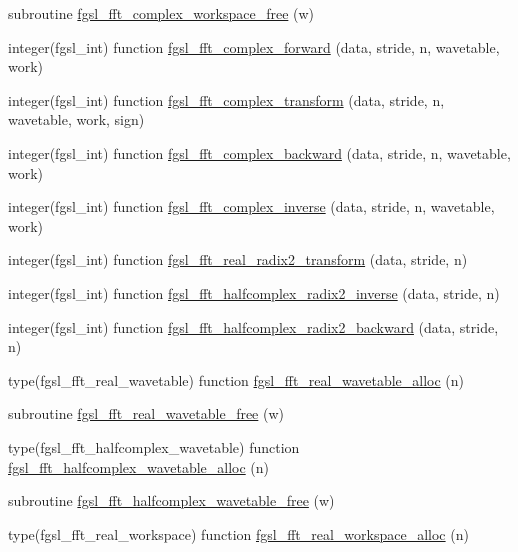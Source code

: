 \begin{DoxyCompactItemize}
subroutine \hyperlink{fft_8finc_a349930160b7e3aa8c2d622086c18cc9f}{fgsl\+\_\+fft\+\_\+complex\+\_\+workspace\+\_\+free} (w)
\item 
integer(fgsl\+\_\+int) function \hyperlink{fft_8finc_a93cd04b58e8404ebe91398ddf33ac2ee}{fgsl\+\_\+fft\+\_\+complex\+\_\+forward} (data, stride, n, wavetable, work)
\item 
integer(fgsl\+\_\+int) function \hyperlink{fft_8finc_a376d447a1955ebc92b2e87a5712185b1}{fgsl\+\_\+fft\+\_\+complex\+\_\+transform} (data, stride, n, wavetable, work, sign)
\item 
integer(fgsl\+\_\+int) function \hyperlink{fft_8finc_a5d26359427318351552aa35ba54fe56a}{fgsl\+\_\+fft\+\_\+complex\+\_\+backward} (data, stride, n, wavetable, work)
\item 
integer(fgsl\+\_\+int) function \hyperlink{fft_8finc_ad553e482847f3d81c3f4bb7f43e68053}{fgsl\+\_\+fft\+\_\+complex\+\_\+inverse} (data, stride, n, wavetable, work)
\item 
integer(fgsl\+\_\+int) function \hyperlink{fft_8finc_a83d3ca22179c1492451233146284096e}{fgsl\+\_\+fft\+\_\+real\+\_\+radix2\+\_\+transform} (data, stride, n)
\item 
integer(fgsl\+\_\+int) function \hyperlink{fft_8finc_a221b77aa4c793385e078efff48b05b78}{fgsl\+\_\+fft\+\_\+halfcomplex\+\_\+radix2\+\_\+inverse} (data, stride, n)
\item 
integer(fgsl\+\_\+int) function \hyperlink{fft_8finc_aa85ca51ea5f1e86190979008004c3e90}{fgsl\+\_\+fft\+\_\+halfcomplex\+\_\+radix2\+\_\+backward} (data, stride, n)
\item 
type(fgsl\+\_\+fft\+\_\+real\+\_\+wavetable) function \hyperlink{fft_8finc_a2d6bd839e5cea8c45db50f3f39250daf}{fgsl\+\_\+fft\+\_\+real\+\_\+wavetable\+\_\+alloc} (n)
\item 
subroutine \hyperlink{fft_8finc_a1a476c3a23eb0379cce21b6796c38f26}{fgsl\+\_\+fft\+\_\+real\+\_\+wavetable\+\_\+free} (w)
\item 
type(fgsl\+\_\+fft\+\_\+halfcomplex\+\_\+wavetable) function \hyperlink{fft_8finc_a8d7b46f387eaaf4045a2ae2a8e71acee}{fgsl\+\_\+fft\+\_\+halfcomplex\+\_\+wavetable\+\_\+alloc} (n)
\item 
subroutine \hyperlink{fft_8finc_aea9fde2535cade327c22905e9507060b}{fgsl\+\_\+fft\+\_\+halfcomplex\+\_\+wavetable\+\_\+free} (w)
\item 
type(fgsl\+\_\+fft\+\_\+real\+\_\+workspace) function \hyperlink{fft_8finc_adbcc56de7ecc248fc58056203f453b5f}{fgsl\+\_\+fft\+\_\+real\+\_\+workspace\+\_\+alloc} (n)
\item 

\end{DoxyCompactItemize}

